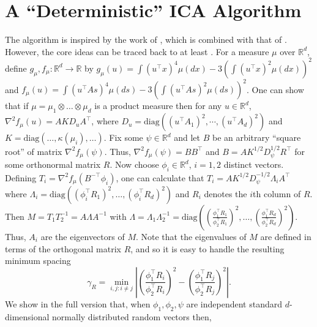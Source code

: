\documentclass{article} %
\newcommand{\R}{\mathbb{R}}
\newcommand{\real}{\mathbb{R}}
\newcommand{\E}{\mathbb{E}}
\theoremstyle{definition}
\begin{document}
\section{A ``Deterministic'' ICA Algorithm}
\label{sec:DICA}
The algorithm is inspired by the work of 
\citet{hsu2013learning}, which is combined with that of \citet{arora2012provable}. However, the core ideas
can be traced back to at least  \citet{frieze1996learning}.
For a measure $\mu$ over $\real^d$, define
 $g_\mu, f_\mu:\real^d \to \real$ by
$g_\mu(u) = \int (u^\top x)^4 \mu(dx) - 3 (\int (u^\top x)^2 \mu(dx) )^2$
and
 $f_\mu(u) = \int (u^\top A s)^4 \mu(ds) - 3 (\int (u^\top As)^2 \mu(ds) )^2$. 
One can show that if $\mu = \mu_1\otimes \dots \otimes \mu_d$ is a product measure then for any $u\in \R^d$,
$\nabla^2 f_\mu(u)=A K D_{u} A^\top$,
	where $D_{u} =\text{diag}\left((u^{\top}A_1)^2,\cdots, (u^{\top}A_d)^2\right)$
	and $K = \text{diag}( \dots, \kappa(\mu_i), \dots)$.
Fix some $\psi\in \R^d$ and let $B$ be an arbitrary ``square root'' of matrix $\nabla^2 f_\mu(\psi)$. Thus, $\nabla^2 f_\mu(\psi)= B B^\top$ and
	$B= AK^{1/2}D_{\psi}^{1/2}R^{\top}$ for some orthonormal matrix $R$.
Now choose $\phi_i\in \R^d$, $i=1,2$ distinct vectors.
Defining $T_i=\nabla^2 f_\mu(B^{-\top} \phi_i)$, one can calculate that
$T_i=A K^{1/2} D_\psi^{-1/2} \Lambda_i A^\top$ where $\Lambda_i =\text{diag}\left( (\phi_i^\top R_1)^2,\ldots,(\phi_i^\top R_d)^2 \right)$ and $R_i$ denotes the $i$th column of $R$.
Then $M=T_1 T_2^{-1} = A\Lambda A^{-1}$ with $\Lambda=\Lambda_1 \Lambda_2^{-1}=\text{diag}\left( \left(\frac{\phi_1^\top R_1}{\phi_2^\top R_1}\right)^2,\ldots,\left(\frac{\phi_1^\top R_d}{\phi_2^\top R_d}\right)^2 \right)$. Thus, $A_i$ are the eigenvectors of $M$.
Note that the eigenvalues of $M$ are defined in terms of the orthogonal matrix $R$,
and so it is easy to handle the resulting minimum spacing
\begin{equation}
\label{def:gammaR}
\gamma_R =  \min_{i,j: i\neq j} \left\vert \left(\frac{\phi_1^{\top}R_i}{\phi_2^{\top}R_i}\right)^2 - \left(\frac{\phi_1^{\top}R_j}{\phi_2^{\top}R_j}\right)^2 \right\vert.
\end{equation}
We show in the full version \citep{HuGySz15} %
that,  when $\phi_1,\phi_2,\psi$ are independent standard $d$-dimensional normally distributed random vectors then,
\end{document}

